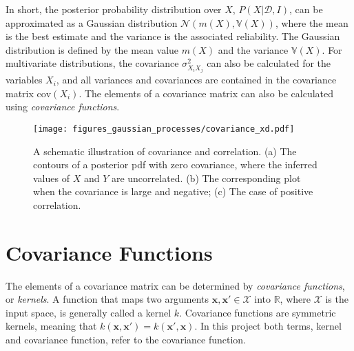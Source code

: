 \documentclass[twoside,english]{uiofysmaster}
\begin{document}
{In short, the posterior probability distribution over $X$, $P(X | \mathcal{D}, I)$, can be approximated as a Gaussian distribution $\mathcal{N}(m(X), \mathbb{V}(X))$, where the mean is the best estimate and the variance is the associated reliability. The Gaussian distribution is defined by the mean value $m(X)$ and the variance $\mathbb{V}(X)$. For multivariate distributions, the covariance $\sigma_{X_i X_j}^2$ can also be calculated for the variables $X_i$, and all variances and covariances are contained in the covariance matrix $\text{cov}(X_i)$. The elements of a covariance matrix can also be calculated using \textit{covariance functions}.

\begin{figure}
\centering
\texttt{[image: figures\_gaussian\_processes/covariance\_xd.pdf]}
\caption{A schematic illustration of covariance and correlation. (a) The contours of a posterior pdf with zero covariance, where the inferred values of $X$ and $Y$ are uncorrelated. (b) The corresponding plot when the covariance is large and negative; (c) The case of positive correlation.}
\label{Fig:: gaussian process : Covariance illustrated}
\end{figure}


\section{Covariance Functions}\label{Sec:: gaussian processes : Covariance functions}


The elements of a covariance matrix can be determined by \textit{covariance functions}, or \textit{kernels}. A function that maps two arguments $\textbf{x},\textbf{x}' \in \mathcal{X}$ into $\mathbb{R}$, where $\mathcal{X}$ is the input space, is generally called a kernel $k$. Covariance functions are symmetric kernels, meaning that $k(\textbf{x}, \textbf{x}') = k(\textbf{x}', \textbf{x})$. In this project both terms, kernel and covariance function, refer to the covariance function. 


}
\end{document}
